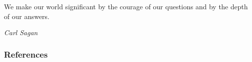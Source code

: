 \documentclass[10pt,xcolor={dvipsnames},handout]{beamer}
\newcommand{\markdone}{\textcolor{PineGreen}{$\bullet$}}
\newcommand{\markonprogress}{\textcolor{colorAzulBienBonito}{$\bullet$}}
\newcommand{\markoff}{\textcolor{PineGreen}{$\circ$}}
\begin{document}


{\aauwavesbg
\begin{frame}
  { \tiny
    \epigraph{\tiny We make our world significant by the courage of our questions and by the depth of our answers.}{\tiny \textit{Carl Sagan}}
  }
\end{frame}}

\begin{frame}[allowframebreaks]
        \frametitle{References}


\end{frame}
\end{document}
